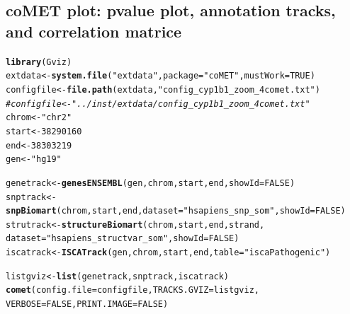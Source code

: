 \documentclass[11pt]{article}\usepackage[]{graphicx}\usepackage[usenames,dvipsnames]{color}
\makeatletter
\newcommand{\hlnum}[1]{\textcolor[rgb]{0.686,0.059,0.569}{#1}}%
\newcommand{\hlstr}[1]{\textcolor[rgb]{0.192,0.494,0.8}{#1}}%
\newcommand{\hlcom}[1]{\textcolor[rgb]{0.678,0.584,0.686}{\textit{#1}}}%
\newcommand{\hlstd}[1]{\textcolor[rgb]{0.345,0.345,0.345}{#1}}%
\newcommand{\hlkwb}[1]{\textcolor[rgb]{0.69,0.353,0.396}{#1}}%
\newcommand{\hlkwc}[1]{\textcolor[rgb]{0.333,0.667,0.333}{#1}}%
\newcommand{\hlkwd}[1]{\textcolor[rgb]{0.737,0.353,0.396}{\textbf{#1}}}%
\newenvironment{kframe}{%
 \def\at@end@of@kframe{}%
 \ifinner\ifhmode%
  \def\at@end@of@kframe{\end{minipage}}%
  \begin{minipage}{\columnwidth}%
 \fi\fi%
 \def\FrameCommand##1{\hskip\@totalleftmargin \hskip-\fboxsep
 \colorbox{shadecolor}{##1}\hskip-\fboxsep
     \hskip-\linewidth \hskip-\@totalleftmargin \hskip\columnwidth}%
 \MakeFramed {\advance\hsize-\width
   \@totalleftmargin\z@ \linewidth\hsize
   \@setminipage}}%
 {\par\unskip\endMakeFramed%
 \at@end@of@kframe}
\newenvironment{knitrout}{}{} %
\makeatother
\begin{document}
\subsection{coMET plot: pvalue plot, annotation tracks, and correlation matrice}
\begin{knitrout}
\color{fgcolor}\begin{kframe}
\begin{alltt}
\hlkwd{library}\hlstd{(Gviz)}
\hlstd{extdata} \hlkwb{<-} \hlkwd{system.file}\hlstd{(}\hlstr{"extdata"}\hlstd{,} \hlkwc{package}\hlstd{=}\hlstr{"coMET"}\hlstd{,}\hlkwc{mustWork}\hlstd{=}\hlnum{TRUE}\hlstd{)}
\hlstd{configfile} \hlkwb{<-} \hlkwd{file.path}\hlstd{(extdata,} \hlstr{"config_cyp1b1_zoom_4comet.txt"}\hlstd{)}
\hlcom{#configfile <- "../inst/extdata/config_cyp1b1_zoom_4comet.txt" }
\hlstd{chrom} \hlkwb{<-} \hlstr{"chr2"}
\hlstd{start} \hlkwb{<-} \hlnum{38290160}
\hlstd{end} \hlkwb{<-} \hlnum{38303219}
\hlstd{gen} \hlkwb{<-} \hlstr{"hg19"}

\hlstd{genetrack} \hlkwb{<-}\hlkwd{genesENSEMBL}\hlstd{(gen,chrom,start,end,}\hlkwc{showId}\hlstd{=}\hlnum{FALSE}\hlstd{)}
\hlstd{snptrack} \hlkwb{<-} \hlkwd{snpBiomart}\hlstd{(chrom, start, end,} \hlkwc{dataset}\hlstd{=}\hlstr{"hsapiens_snp_som"}\hlstd{,}\hlkwc{showId}\hlstd{=}\hlnum{FALSE}\hlstd{)}
\hlstd{strutrack} \hlkwb{<-} \hlkwd{structureBiomart}\hlstd{(chrom, start, end, strand,}
                              \hlkwc{dataset}\hlstd{=}\hlstr{"hsapiens_structvar_som"}\hlstd{,}\hlkwc{showId}\hlstd{=}\hlnum{FALSE}\hlstd{)}
\hlstd{iscatrack} \hlkwb{<-}\hlkwd{ISCATrack}\hlstd{(gen,chrom,start,end,}\hlkwc{table}\hlstd{=}\hlstr{"iscaPathogenic"}\hlstd{)}

\hlstd{listgviz} \hlkwb{<-} \hlkwd{list}\hlstd{(genetrack,snptrack,iscatrack)}
\hlkwd{comet}\hlstd{(}\hlkwc{config.file}\hlstd{=configfile,}\hlkwc{TRACKS.GVIZ}\hlstd{=listgviz,}
      \hlkwc{VERBOSE}\hlstd{=}\hlnum{FALSE}\hlstd{,} \hlkwc{PRINT.IMAGE}\hlstd{=}\hlnum{FALSE}\hlstd{)}
\end{alltt}
\end{kframe}
\end{knitrout}
\end{document}
